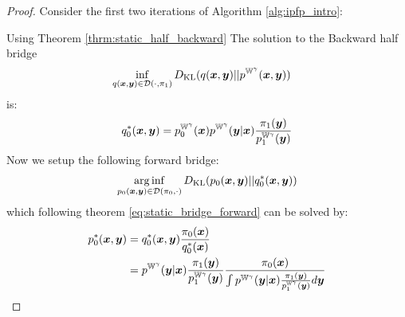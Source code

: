 \documentclass[a4paper,12pt,twoside,openright]{report}
\theoremstyle{definition}
\begin{document}
\begin{proof}
Consider the first two iterations of Algorithm \ref{alg:ipfp_intro}:

Using Theorem \ref{thrm:static_half_backward}  The solution to the Backward half bridge
 \begin{align}
        \inf_{q({\bm{x}},{\bm{y}}) \in {\mathcal{D}}( \cdot, \pi_1)} D_{\mathrm{KL}}  &(q({\bm{x}},{\bm{y}}) || p^{\mathbb{W}^{\gamma}}({\bm{x}},{\bm{y}})) \nonumber 
\end{align}
is:
\begin{align}
    q_0^{*} ({\bm{x}}, {\bm{y}}) = p^{\mathbb{W}^{\gamma}}_0({\bm{x}}) p^{\mathbb{W}^{\gamma}}({\bm{y}}| {\bm{x}}) \frac{\pi_1({\bm{y}})}{p^{\mathbb{W}^{\gamma}}_1({\bm{y}})}
\end{align}
Now we setup the following forward bridge:
\begin{align}
    \operatorname*{arg\,inf}_{p_0({\bm{x}}, {\bm{y}})  \in {\mathcal{D}}(\pi_0 , \cdot)}D_{\mathrm{KL}} (p_0({\bm{x}}, {\bm{y}}) ||q_0^{*} ({\bm{x}}, {\bm{y}}))
\end{align}
which following theorem \ref{eq:static_bridge_forward} can be solved by:
\begingroup
\allowdisplaybreaks
\begin{align}
    p_0^{*} ({\bm{x}}, {\bm{y}}) &= q_0^{*} ({\bm{x}}, {\bm{y}}) \frac{\pi_0({\bm{x}})}{q_0^{*} ({\bm{x}})} \\
 &=  p^{\mathbb{W}^{\gamma}}({\bm{y}}| {\bm{x}}) \frac{\pi_1({\bm{y}})}{p^{\mathbb{W}^{\gamma}}_1({\bm{y}})} \frac{\pi_0({\bm{x}})}{\int   p^{\mathbb{W}^{\gamma}}({\bm{y}}| {\bm{x}}) \frac{\pi_1({\bm{y}})}{p^{\mathbb{W}^{\gamma}}_1({\bm{y}})} d{\bm{y}}}
\end{align}
\endgroup


\end{proof}
\end{document}
